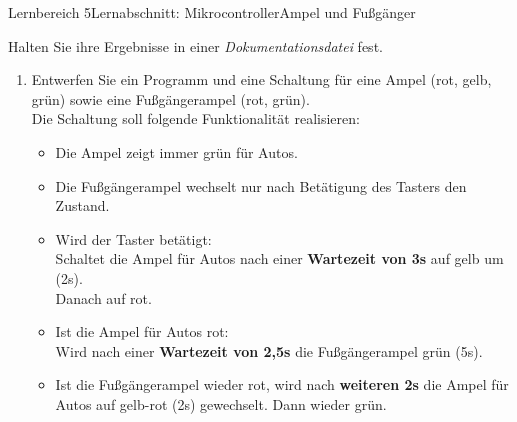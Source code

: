 \documentclass[oneside,openany,headings=optiontotoc,11pt,numbers=noenddot]{scrreprt}
\begin{document}
		\begin{worksheet}{Lernbereich 5}{Lernabschnitt: Mikrocontroller}{Ampel und Fußgänger}
			\begin{framed}
				\noindent
				Halten Sie ihre Ergebnisse in einer \textit{Dokumentationsdatei} fest.
				\begin{enumerate}
					\item Entwerfen Sie ein Programm und eine Schaltung für eine Ampel (rot, gelb, grün) sowie eine Fußgängerampel (rot, grün).\\
					Die Schaltung soll folgende Funktionalität realisieren:
					\begin{itemize}
						\item Die Ampel zeigt immer grün für Autos.
						\item Die Fußgängerampel wechselt nur nach Betätigung des Tasters den Zustand.\\
						\item Wird der Taster betätigt:\\
						Schaltet die Ampel für Autos nach einer \textbf{Wartezeit von 3s} auf gelb um (2s).\\
						Danach auf rot.
						\item Ist die Ampel für Autos rot:\\
						Wird nach einer \textbf{Wartezeit von 2,5s} die Fußgängerampel grün (5s).
						\item Ist die Fußgängerampel wieder rot, wird nach \textbf{weiteren 2s} die Ampel für Autos auf gelb-rot (2s) gewechselt. Dann wieder grün.
					\end{itemize}
				\end{enumerate}
			\end{framed}
		\end{worksheet}	
\end{document}

